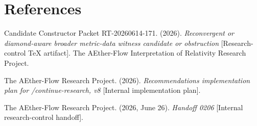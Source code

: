 \documentclass[11pt]{article}
\begin{document}
\section*{References}

Candidate Constructor Packet RT-20260614-171. (2026).
\textit{Reconvergent or diamond-aware broader metric-data witness candidate or
obstruction} [Research-control TeX artifact]. The AEther-Flow Interpretation
of Relativity Research Project.

The AEther-Flow Research Project. (2026). \textit{Recommendations
implementation plan for /continue-research, v8} [Internal implementation plan].

The AEther-Flow Research Project. (2026, June 26). \textit{Handoff 0206}
[Internal research-control handoff].
\end{document}
